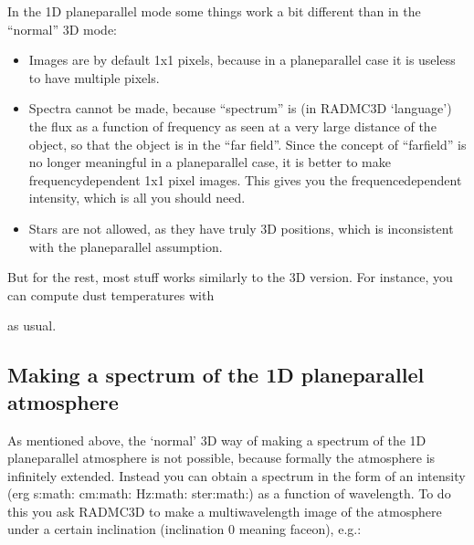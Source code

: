 \documentclass[letterpaper,10pt,english]{sphinxmanual}
\begin{document}
In the 1\sphinxhyphen{}D plane\sphinxhyphen{}parallel mode some things work a bit different than in the
“normal” 3\sphinxhyphen{}D mode:
\begin{itemize}
\item {} 
Images are by default 1x1 pixels, because in a plane\sphinxhyphen{}parallel case it
is useless to have multiple pixels.

\item {} 
Spectra cannot be made, because “spectrum” is (in RADMC\sphinxhyphen{}3D ‘language’)
the flux as a function of frequency as seen at a very large distance of
the object, so that the object is in the “far field”. Since the concept of
“far\sphinxhyphen{}field” is no longer meaningful in a plane\sphinxhyphen{}parallel case, it is better
to make frequency\sphinxhyphen{}dependent 1x1 pixel images. This gives you the
frequence\sphinxhyphen{}dependent intensity, which is all you should need.

\item {} 
Stars are not allowed, as they have truly 3\sphinxhyphen{}D positions, which is
inconsistent with the plane\sphinxhyphen{}parallel assumption.

\end{itemize}

But for the rest, most stuff works similarly to the 3\sphinxhyphen{}D version. For instance,
you can compute dust temperatures with

\begin{sphinxVerbatim}[commandchars=\\\{\}]
 
\end{sphinxVerbatim}

as usual.


\subsection{Making a spectrum of the 1\sphinxhyphen{}D plane\sphinxhyphen{}parallel atmosphere}
\label{\detokenize{gridding:making-a-spectrum-of-the-1-d-plane-parallel-atmosphere}}
As mentioned above, the ‘normal’ 3\sphinxhyphen{}D way of making a spectrum of the 1\sphinxhyphen{}D
plane\sphinxhyphen{}parallel atmosphere is not possible, because formally the atmosphere is
infinitely extended. Instead you can obtain a spectrum in the form of an
intensity (erg s:math: cm:math: Hz:math: ster:math:)
as a function of wavelength. To do this you ask RADMC\sphinxhyphen{}3D to make a
multi\sphinxhyphen{}wavelength image of the atmosphere under a certain inclination
(inclination 0 meaning face\sphinxhyphen{}on), e.g.:
\end{document}

